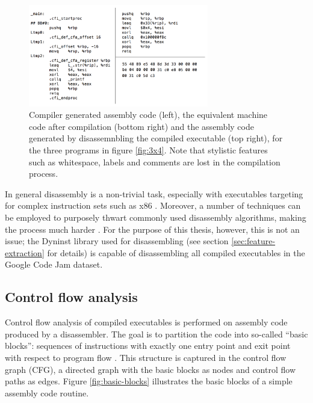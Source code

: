 \documentclass[a4paper,11pt]{kth-mag}
\begin{document}
\begin{figure}[!htb]
    \centering
    \includegraphics[width=0.7\textwidth]{asm-disasm}
    \caption{Compiler generated assembly code (left), the equivalent machine
    code after compilation (bottom right) and the assembly code generated by
    disassemnbling the compiled executable (top right), for the three programs
    in figure \ref{fig:3x4}. Note that stylistic features such as whitespace,
    labels and comments are lost in the compilation process.}
    \label{fig:disasm}
\end{figure}

In general disassembly is a non-trivial task, especially with executables
targeting for complex instruction sets such as x86
\parencite{wartell2011differentiating}. Moreover, a number of techniques can be
employed to purposely thwart commonly used disassembly algorithms, making the
process much harder \parencite{linn2003obfuscation}. For the purpose of this
thesis, however, this is not an issue; the Dyninst library used for
disassembling (see section \ref{sec:feature-extraction} for details) is capable
of disassembling all compiled executables in the Google Code Jam dataset.

\subsection{Control flow analysis}
Control flow analysis of compiled executables is performed on assembly code
produced by a disassembler. The goal is to partition the code into so-called
``basic blocks'': sequences of instructions with exactly one entry point and
exit point with respect to program flow \parencite{allen1970control}. This
structure is captured in the control flow graph (CFG), a directed graph with
the basic blocks as nodes and control flow paths as edges. Figure
\ref{fig:basic-blocks} illustrates the basic blocks of a simple assembly code
routine.
\end{document}

